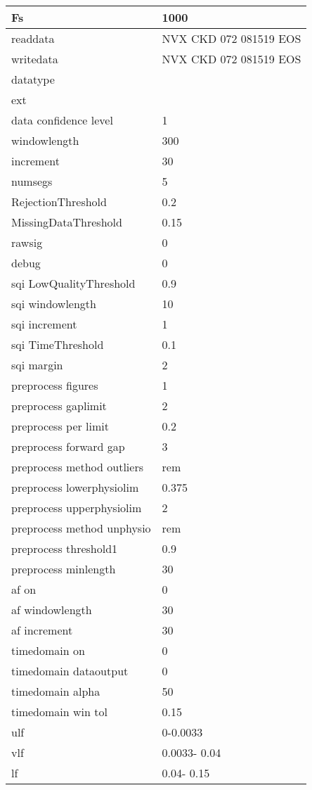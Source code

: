 \begin{tabular}{|l|l|}
\hline
Fs&1000\\\hline
readdata&NVX CKD 072 081519 EOS\\\hline
writedata&NVX CKD 072 081519 EOS\\\hline
datatype&\\\hline
ext&\\\hline
data confidence level&1\\\hline
windowlength&300\\\hline
increment&30\\\hline
numsegs&5\\\hline
RejectionThreshold&0.2\\\hline
MissingDataThreshold&0.15\\\hline
rawsig&0\\\hline
debug&0\\\hline
sqi LowQualityThreshold&0.9\\\hline
sqi windowlength&10\\\hline
sqi increment&1\\\hline
sqi TimeThreshold&0.1\\\hline
sqi margin&2\\\hline
preprocess figures&1\\\hline
preprocess gaplimit&2\\\hline
preprocess per limit&0.2\\\hline
preprocess forward gap&3\\\hline
preprocess method outliers&rem\\\hline
preprocess lowerphysiolim&0.375\\\hline
preprocess upperphysiolim&2\\\hline
preprocess method unphysio&rem\\\hline
preprocess threshold1&0.9\\\hline
preprocess minlength&30\\\hline
af on&0\\\hline
af windowlength&30\\\hline
af increment&30\\\hline
timedomain on&0\\\hline
timedomain dataoutput&0\\\hline
timedomain alpha&50\\\hline
timedomain win tol&0.15\\\hline
ulf&     0-0.0033\\\hline
vlf&0.0033-  0.04\\\hline
lf&  0.04-  0.15\\\hline

\end{tabular}
